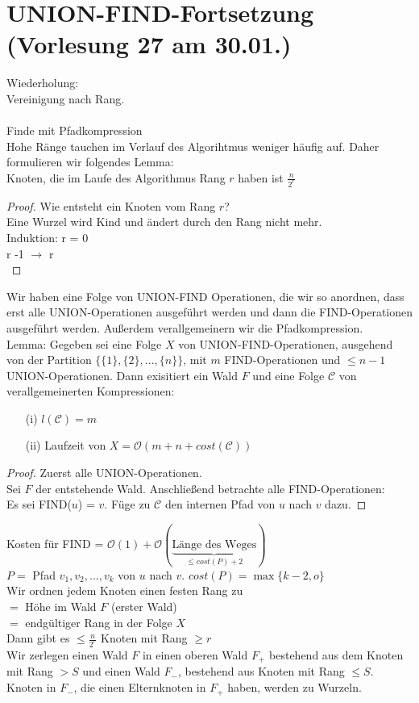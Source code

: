 \section{ UNION-FIND-Fortsetzung \tiny (Vorlesung 27 am 30.01.)}
Wiederholung:\\
Vereinigung nach Rang.\\
\\
Finde mit Pfadkompression\\
Hohe Ränge tauchen im Verlauf des Algorihtmus weniger häufig auf. Daher formulieren wir folgendes Lemma:\\
Knoten, die im Laufe des Algorithmus Rang $r$ haben ist $\frac{n}{2^r}$
\begin{proof} Wie entsteht ein Knoten vom Rang $r$?\\
Eine Wurzel wird Kind und ändert durch den Rang nicht mehr.\\
Induktion: r = 0 \checkmark\\
r -1 $\rightarrow$ r \checkmark\\
\end{proof}
Wir haben eine Folge von UNION-FIND Operationen, die wir so anordnen, dass erst alle UNION-Operationen ausgeführt werden und dann die FIND-Operationen ausgeführt werden. Außerdem verallgemeinern wir die Pfadkompression.\\
Lemma: Gegeben sei eine Folge $X$ von UNION-FIND-Operationen, ausgehend von der Partition $\{\{ 1\},\{2 \},...,\{n \} \}$, mit $m$ FIND-Operationen und $\leq n-1$ UNION-Operationen. Dann exisitiert ein Wald $F$ und eine Folge $\mathcal{C}$ von verallgemeinerten Kompressionen:
\begin{enumerate}
\item[(i)] $l(\mathcal{C}) = m$
\item[(ii)] Laufzeit von $X = \mathcal{O}(m+n+cost(\mathcal{C}))$ 
\end{enumerate}
\begin{proof}
Zuerst alle UNION-Operationen.\\
Sei $F$ der entstehende Wald. Anschließend betrachte alle FIND-Operationen:\\
Es sei FIND($u$) = $v$. Füge zu $\mathcal{C}$ den internen Pfad von $u$ nach $v$ dazu.
\end{proof}
Kosten für FIND = $\mathcal{O}(1) + \mathcal{O}(\underbrace{\text{Länge des Weges}}_{\leq cost(P)+2})$\\
$P=$ Pfad $v_1,v_2,...,v_k$ von $u$ nach $v$. $cost(P) = \max \{ k-2,o\}$\\
Wir ordnen jedem Knoten einen festen Rang zu\\
$=$ Höhe im Wald $F$ (erster Wald)\\
$=$ endgültiger Rang in der Folge $X$\\
Dann gibt es $\leq \frac{n}{2^r}$ Knoten mit Rang $\geq r$\\
Wir zerlegen einen Wald $F$ in einen oberen Wald $F_+$ bestehend aus dem Knoten mit Rang $>S$ und einen Wald $F_-$, bestehend aus Knoten mit Rang $\leq S$. Knoten in $F_-$, die einen Elternknoten in $F_+$ haben, werden zu Wurzeln.\\
